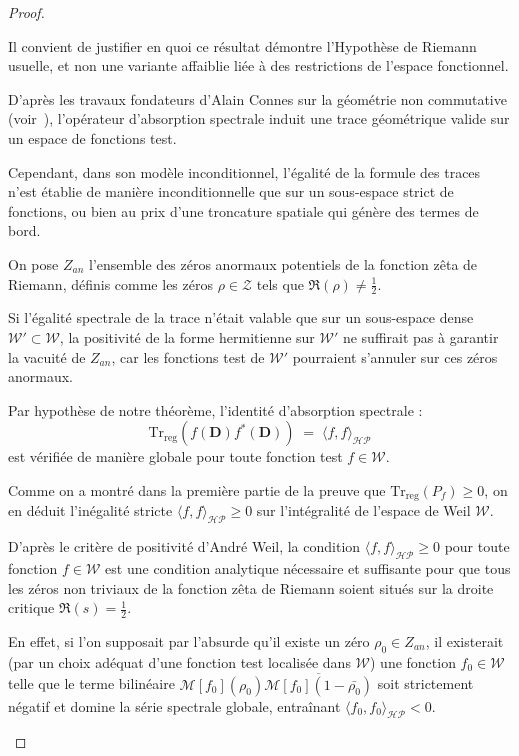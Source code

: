 \documentclass[Riemann_Hypothesis.tex]{subfiles}
\begin{document}
\begin{proof}
    \begin{part_proof}
        Il convient de justifier en quoi ce résultat démontre l'Hypothèse de Riemann usuelle, et non une variante affaiblie liée à des restrictions de l'espace fonctionnel. \par
        D'après les travaux fondateurs d'Alain Connes sur la géométrie non commutative (voir~\cite{connes1999_trace}), l'opérateur d'absorption spectrale induit une trace géométrique valide sur un espace de fonctions test. \par
        Cependant, dans son modèle inconditionnel, l'égalité de la formule des traces n'est établie de manière inconditionnelle que sur un sous-espace strict de fonctions, ou bien au prix d'une troncature spatiale qui génère des termes de bord. \par
        On pose $Z_{an}$ l'ensemble des zéros anormaux potentiels de la fonction zêta de Riemann, définis comme les zéros $\rho \in \mathcal{Z}$ tels que $\Re(\rho) \neq \frac{1}{2}$. \par
        Si l'égalité spectrale de la trace n'était valable que sur un sous-espace dense $\mathcal{W}' \subset \mathcal{W}$, la positivité de la forme hermitienne sur $\mathcal{W}'$ ne suffirait pas à garantir la vacuité de $Z_{an}$, car les fonctions test de $\mathcal{W}'$ pourraient s'annuler sur ces zéros anormaux. \par
        Par hypothèse de notre théorème, l'identité d'absorption spectrale :
        \begin{equation*}
            \mathrm{Tr}_{\mathrm{reg}}\left( f(\mathbf{D}) f^*(\mathbf{D}) \right) \;=\; \langle f, f \rangle_{\mathcal{HP}}
        \end{equation*}
        est vérifiée de manière globale pour toute fonction test $f \in \mathcal{W}$. \par
        Comme on a montré dans la première partie de la preuve que $\mathrm{Tr}_{\mathrm{reg}}\left( P_f \right) \ge 0$, on en déduit l'inégalité stricte $\langle f, f \rangle_{\mathcal{HP}} \ge 0$ sur l'intégralité de l'espace de Weil $\mathcal{W}$. \par
        D'après le critère de positivité d'André Weil, la condition $\langle f, f \rangle_{\mathcal{HP}} \ge 0$ pour toute fonction $f \in \mathcal{W}$ est une condition analytique nécessaire et suffisante pour que tous les zéros non triviaux de la fonction zêta de Riemann soient situés sur la droite critique $\Re(s) = \frac{1}{2}$. \par
        En effet, si l'on supposait par l'absurde qu'il existe un zéro $\rho_0 \in Z_{an}$, il existerait (par un choix adéquat d'une fonction test localisée dans $\mathcal{W}$) une fonction $f_0 \in \mathcal{W}$ telle que le terme bilinéaire $\mathcal{M}[f_0](\rho_0) \overline{\mathcal{M}[f_0](1-\bar{\rho_0})}$ soit strictement négatif et domine la série spectrale globale, entraînant $\langle f_0, f_0 \rangle_{\mathcal{HP}} < 0$. \par

\end{part_proof}
\end{proof}
\end{document}
